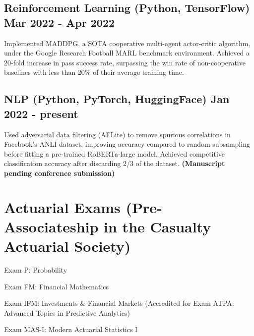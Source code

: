\documentclass[letter,10pt]{article}
\begin{document}
\subsection{{Reinforcement Learning (Python, TensorFlow) \hfill Mar 2022 - Apr 2022}}
\begin{zitemize}
\item \normalfont Implemented MADDPG, a SOTA cooperative multi-agent actor-critic algorithm, under the Google Research Football MARL benchmark environment. Achieved a 20-fold increase in pass success rate, surpassing the win rate of non-cooperative baselines with less than 20\% of their average training time.
\end{zitemize}


\subsection{{NLP (Python, PyTorch, HuggingFace) \hfill Jan 2022 - present}}
\begin{zitemize}
\item \normalfont Used adversarial data filtering (AFLite) to remove spurious correlations in Facebook's ANLI dataset, improving accuracy compared to random subsampling before fitting a pre-trained RoBERTa-large model. Achieved competitive classification accuracy after discarding 2/3 of the dataset. \bf{(Manuscript pending conference submission)}
\end{zitemize}


\section{Actuarial Exams (Pre-Associateship in the Casualty Actuarial Society)}
\begin{zitemize}
\item Exam P: Probability
\item Exam FM: Financial Mathematics
\item Exam IFM: Investments \& Financial Markets (Accredited for Exam ATPA: Advanced Topics in Predictive Analytics)
\item Exam MAS-I: Modern Actuarial Statistics I
\end{zitemize}
\end{document}

